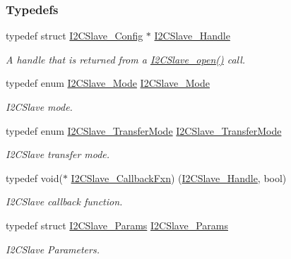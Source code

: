 \subsubsection*{Typedefs}
\begin{DoxyCompactItemize}
\item 
typedef struct \hyperlink{struct_i2_c_slave___config}{I2\+C\+Slave\+\_\+\+Config} $\ast$ \hyperlink{_i2_c_slave_8h_a302d775f802ff66ed2ca05e1956f738e}{I2\+C\+Slave\+\_\+\+Handle}
\begin{DoxyCompactList}\small\item\em A handle that is returned from a \hyperlink{_i2_c_slave_8h_abdfc770ace6accbf91b91f3e195e7119}{I2\+C\+Slave\+\_\+open()} call. \end{DoxyCompactList}\item 
typedef enum \hyperlink{_i2_c_slave_8h_a85d8ab819c05086d764dfd0a257b97ca}{I2\+C\+Slave\+\_\+\+Mode} \hyperlink{_i2_c_slave_8h_aa33e86864be8bf1597048f105b5ef9d0}{I2\+C\+Slave\+\_\+\+Mode}
\begin{DoxyCompactList}\small\item\em I2\+C\+Slave mode. \end{DoxyCompactList}\item 
typedef enum \hyperlink{_i2_c_slave_8h_a5e27f9ba25088f9e7071e3e6f806559d}{I2\+C\+Slave\+\_\+\+Transfer\+Mode} \hyperlink{_i2_c_slave_8h_a788e85749c883393490ad7e49d19b22d}{I2\+C\+Slave\+\_\+\+Transfer\+Mode}
\begin{DoxyCompactList}\small\item\em I2\+C\+Slave transfer mode. \end{DoxyCompactList}\item 
typedef void($\ast$ \hyperlink{_i2_c_slave_8h_a2f0d1d9022a0668ad78e7ff37298d24a}{I2\+C\+Slave\+\_\+\+Callback\+Fxn}) (\hyperlink{_i2_c_slave_8h_a302d775f802ff66ed2ca05e1956f738e}{I2\+C\+Slave\+\_\+\+Handle}, bool)
\begin{DoxyCompactList}\small\item\em I2\+C\+Slave callback function. \end{DoxyCompactList}\item 
typedef struct \hyperlink{struct_i2_c_slave___params}{I2\+C\+Slave\+\_\+\+Params} \hyperlink{_i2_c_slave_8h_a9cd68573732e7853e3b14af2ec7e7652}{I2\+C\+Slave\+\_\+\+Params}
\begin{DoxyCompactList}\small\item\em I2\+C\+Slave Parameters. \end{DoxyCompactList}\item 

\end{DoxyCompactItemize}
